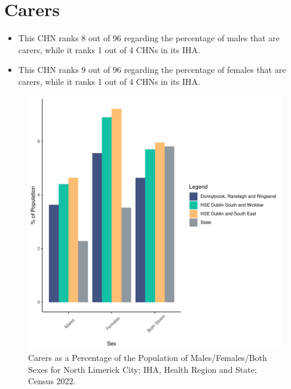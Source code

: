 \documentclass{article}
\begin{document}
\section{Carers}\label{sect:Carers}
\begin{itemize}
\item This CHN ranks  8 out of 96 regarding the percentage of males that are carers, while it ranks   1 out of 4 CHNs in its IHA.
\item This CHN ranks  9 out of 96 regarding the percentage of females that are carers, while it ranks   1 out of 4 CHNs in its IHA.
\end{itemize}
\begin{figure}[H]
	\centering
	\includegraphics[width = 150mm]{../figures/CareED.pdf}
	\caption{Carers as a Percentage of the Population of Males/Females/Both Sexes for North Limerick City; IHA, Health Region and State; Census 2022.}
	\label{fig:2ae19629-1a6a-13a3-e055-000000000001}
	\end{figure}
\end{document}
